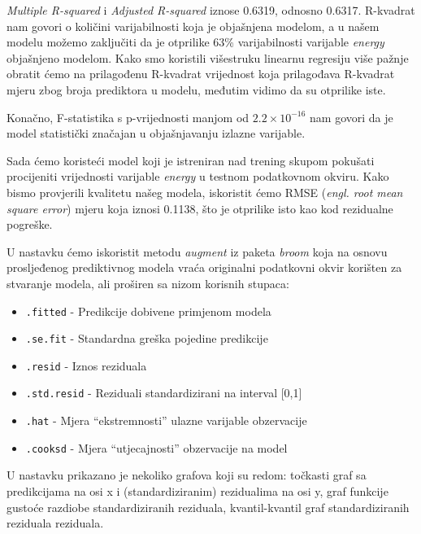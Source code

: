 	\textit{Multiple R-squared} i \textit{Adjusted R-squared} iznose 0.6319, odnosno 0.6317. R-kvadrat nam govori o količini varijabilnosti koja je objašnjena modelom, a u našem modelu možemo zaključiti da je otprilike 63\% varijabilnosti varijable \textit{energy} objašnjeno modelom. Kako smo koristili višestruku linearnu regresiju više pažnje obratit ćemo na prilagođenu R-kvadrat vrijednost koja prilagođava R-kvadrat mjeru zbog broja prediktora u modelu, međutim vidimo da su otprilike iste.
	
	Konačno, F-statistika s p-vrijednosti manjom od \(2.2 \times 10^{-16}\) nam govori da je model statistički značajan u objašnjavanju izlazne varijable.
	
	
	Sada ćemo koristeći model koji je istreniran nad trening skupom pokušati procijeniti vrijednosti varijable \textit{energy} u testnom podatkovnom okviru. Kako bismo provjerili kvalitetu našeg modela, iskoristit ćemo RMSE (\textit{engl. root mean square error}) mjeru koja iznosi 0.1138, što je otprilike isto kao kod rezidualne pogreške.
	
	U nastavku ćemo iskoristit metodu \textit{augment} iz paketa \textit{broom} koja na osnovu prosljeđenog prediktivnog modela vraća originalni podatkovni okvir korišten za stvaranje modela, ali proširen sa nizom korisnih stupaca:
	\begin{itemize}
		\item \texttt{.fitted} - Predikcije dobivene primjenom modela
		\item \texttt{.se.fit} - Standardna greška pojedine predikcije
		\item \texttt{.resid} - Iznos reziduala
		\item \texttt{.std.resid} - Reziduali standardizirani na interval [0,1]
		\item \texttt{.hat} - Mjera “ekstremnosti” ulazne varijable obzervacije
		\item \texttt{.cooksd} - Mjera “utjecajnosti” obzervacije na model
	\end{itemize}
	
	U nastavku prikazano je nekoliko grafova koji su redom: točkasti graf sa predikcijama na osi x i (standardiziranim) rezidualima na osi y, graf funkcije gustoće razdiobe standardiziranih reziduala, kvantil-kvantil graf standardiziranih reziduala
	reziduala.
	
